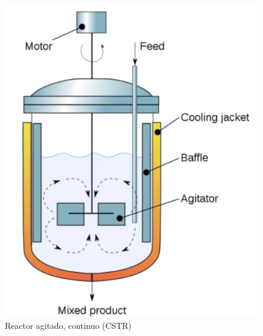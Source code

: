 \begin{multicols}{2}
    \begin{figure}
        \centering
        \includegraphics[width=\textwidth]{img/esquemas/reactor_cstr.png}
        \caption{Reactor agitado, continuo (CSTR)}
        \label{fig:reactor_cstr}
    \end{figure}
\end{multicols}

